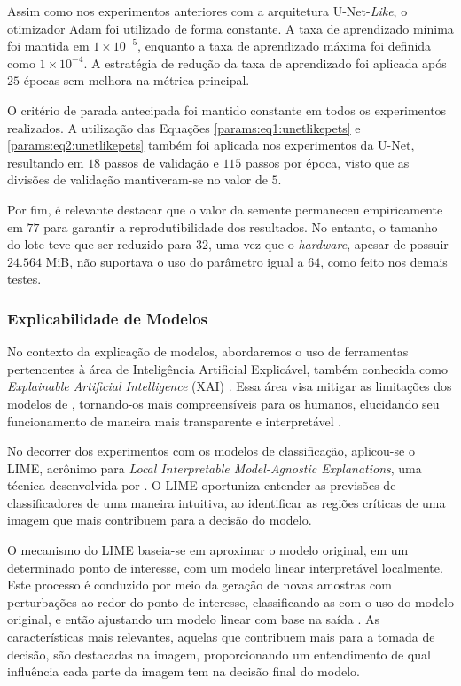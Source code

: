 Assim como nos experimentos anteriores com a arquitetura U-Net-\textit{Like}, o otimizador Adam foi utilizado de forma constante. A taxa de aprendizado mínima foi mantida em $1 \times 10^{-5}$, enquanto a taxa de aprendizado máxima foi definida como $1 \times 10^{-4}$. A estratégia de redução da taxa de aprendizado foi aplicada após $25$ épocas sem melhora na métrica principal.

O critério de parada antecipada foi mantido constante em todos os experimentos realizados. A utilização das Equações \ref{params:eq1:unetlikepets} e \ref{params:eq2:unetlikepets} também foi aplicada nos experimentos da U-Net, resultando em $18$ passos de validação e $115$ passos por época, visto que as divisões de validação mantiveram-se no valor de $5$.

Por fim, é relevante destacar que o valor da semente permaneceu empiricamente em $77$ para garantir a reprodutibilidade dos resultados. No entanto, o tamanho do lote teve que ser reduzido para $32$, uma vez que o \textit{hardware}, apesar de possuir $24.564$ MiB, não suportava o uso do parâmetro igual a $64$, como feito nos demais testes.


\subsubsection{Explicabilidade de Modelos}
\label{project:explain}
No contexto da explicação de modelos, abordaremos o uso de ferramentas pertencentes à área de Inteligência Artificial Explicável, também conhecida como \textit{Explainable Artificial Intelligence} (XAI) \citep{Gunning2019XAIExplainableIntelligence}. Essa área visa mitigar as limitações dos modelos de , tornando-os mais compreensíveis para os humanos, elucidando seu funcionamento de maneira mais transparente e interpretável \citep{Angelov2021ExplainableReview}.

No decorrer dos experimentos com os modelos de classificação, aplicou-se o LIME, acrônimo para \textit{Local Interpretable Model-Agnostic Explanations}, uma técnica desenvolvida por \cite{Ribeiro2016WhyClassifier}. O LIME oportuniza entender as previsões de classificadores de uma maneira intuitiva, ao identificar as regiões críticas de uma imagem que mais contribuem para a decisão do modelo.

O mecanismo do LIME baseia-se em aproximar o modelo original, em um determinado ponto de interesse, com um modelo linear interpretável localmente. Este processo é conduzido por meio da geração de novas amostras com perturbações ao redor do ponto de interesse, classificando-as com o uso do modelo original, e então ajustando um modelo linear com base na saída \citep{Ribeiro2016WhyClassifier}. As características mais relevantes, aquelas que contribuem mais para a tomada de decisão, são destacadas na imagem, proporcionando um entendimento de qual influência cada parte da imagem tem na decisão final do modelo.

